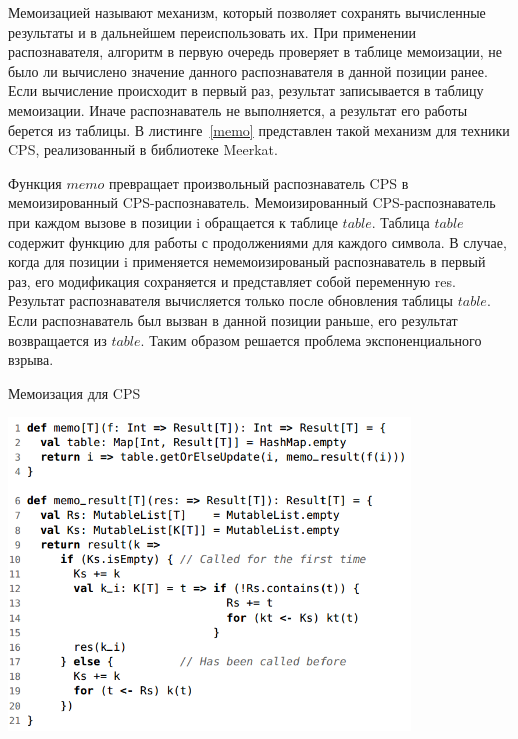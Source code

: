  Мемоизацией называют механизм, который позволяет сохранять вычисленные результаты и в дальнейшем переиспользовать их. При применении распознавателя, алгоритм в первую очередь проверяет в таблице мемоизации, не было ли вычислено значение данного распознавателя в данной позиции ранее. Если вычисление происходит в первый раз, результат записывается в таблицу мемоизации. Иначе распознаватель не выполняется, а результат его работы берется из таблицы. В листинге~\ref{memo} представлен такой механизм для техники CPS, реализованный в библиотеке Meerkat.

 Функция $memo$ превращает произвольный распознаватель CPS в мемоизированный CPS-распознаватель. Мемоизированный CPS-распознаватель при каждом вызове в позиции i обращается к таблице $table$. Таблица $table$ содержит функцию для работы с продолжениями для каждого символа. В случае, когда для позиции i применяется немемоизированый распознаватель в первый раз, его модификация сохраняется и представляет собой переменную res. Результат распознавателя вычисляется только после обновления таблицы $table$. Если распознаватель был вызван в данной позиции раньше, его результат возвращается из $table$. Таким образом решается проблема экспоненциального взрыва.

\begin{listing}
\caption{Мемоизация для CPS}
\label{memo}
\centering
\includegraphics[width=0.8\textwidth]{Smolina/pics/memo.png}
\end{listing}


